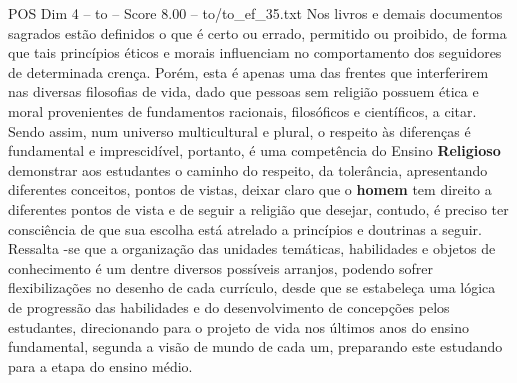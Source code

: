 \begin{textsample}{POS Dim 4 – to – Score 8.00 – to/to\_ef\_35.txt}
Nos livros e demais documentos sagrados estão definidos o que é certo ou errado, permitido ou proibido, de forma que tais princípios éticos e morais influenciam no comportamento dos seguidores de determinada crença.
Porém, esta é apenas uma das frentes que interferirem nas diversas filosofias de vida, dado que pessoas sem religião possuem ética e moral provenientes de fundamentos racionais, filosóficos e científicos, a citar.
Sendo assim, num universo multicultural e plural, o respeito às diferenças é fundamental e imprescidível, portanto, é uma competência do Ensino \textbf{Religioso} demonstrar aos estudantes o caminho do respeito, da tolerância, apresentando diferentes conceitos, pontos de vistas, deixar claro que o \textbf{homem} tem direito a diferentes pontos de vista e de seguir a religião que desejar, contudo, é preciso ter consciência de que sua escolha está atrelado a princípios e doutrinas a seguir.
Ressalta -se que a organização das unidades temáticas, habilidades e objetos de conhecimento é um dentre diversos possíveis arranjos, podendo sofrer flexibilizações no desenho de cada currículo, desde que se estabeleça uma lógica de progressão das habilidades e do desenvolvimento de concepções pelos estudantes, direcionando para o projeto de vida nos últimos anos do ensino fundamental, segunda a visão de mundo de cada um, preparando este estudando para a etapa do ensino médio.

\end{textsample}
